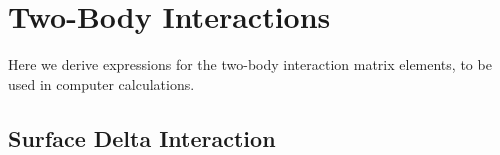 \documentclass[../main/report.tex]{subfiles}
\begin{document}
\section{Two-Body Interactions}

Here we derive expressions for the two-body interaction matrix elements, to be used in computer calculations. 

\subsection{Surface Delta Interaction}
\label{app:SDI}

\end{document}
